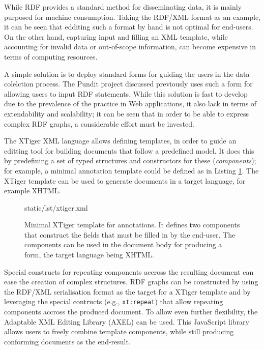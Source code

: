 While RDF provides a standard method for disseminating data, it is mainly
purposed for machine consumption. Taking the RDF/XML format as an example, it
can be seen that edditing such a format by hand is not optimal for end-users.
On the other hand, capturing input and filling an XML template, while
accounting for invalid data or out-of-scope information, can become expensive
in terms of computing resources.

A simple solution is to deploy standard forms for guiding the users in the data
colelction process. The Pundit project discussed previously uses such a form for
allowing users to input RDF statements. While this solution is fast to develop
due to the prevalence of the practice in Web applications, it also lack in terms
of extendability and scalability; it can be seen that in order to be able to
express complex RDF graphs, a considerable effort must be invested.

The XTiger \cite{ref:xtiger} XML language allows defining templates, in order
to guide an editting tool for building documents that follow a predefined
model. It does this by predefining a set of typed structures and constructors
for these (\textit{components}); for example, a minimal annotation template
could be defined as in Listing \ref{lst:xtiger}. The XTiger template can be
used to generate documents in a target language, for example XHTML.

\begin{figure}[!h]
  
    {static/lst/xtiger.xml}
    \caption[XTiger template fragment for annotations]
            {Minimal XTiger template for annotations. It defines two components
             that construct the fields that must be filled in by the end-user.
             The components can be used in the document body for producing
             a form, the target language being XHTML.}
    \label{lst:xtiger}
\end{figure}

Special constructs for repeating components accross the resulting document can
ease the creation of complex structures. RDF graphs can be constructed by using
the RDF/XML serialisation format as the target for a XTiger template and by
leveraging the special contructs (e.g., \texttt{xt:repeat}) that allow
repeating components accross the produced document. To allow even further
flexibility, the Adaptable XML Editing Library (AXEL) \cite{ref:axel} can be
used. This JavaScript library allows users to freely combine template
components, while still producing conforming documents as the end-result.

